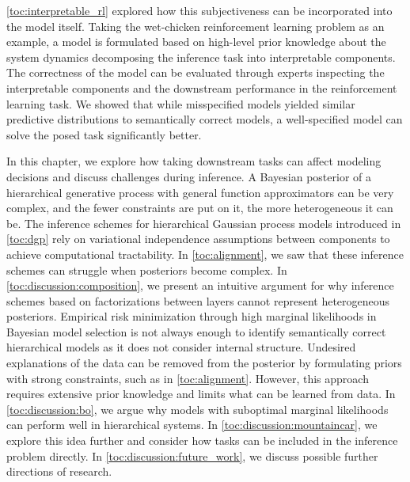 \cref{toc:interpretable_rl} explored how this subjectiveness can be incorporated into the model itself.
Taking the wet-chicken reinforcement learning problem as an example, a model is formulated based on high-level prior knowledge about the system dynamics decomposing the inference task into interpretable components.
The correctness of the model can be evaluated through experts inspecting the interpretable components and the downstream performance in the reinforcement learning task.
We showed that while misspecified models yielded similar predictive distributions to semantically correct models, a well-specified model can solve the posed task significantly better.

In this chapter, we explore how taking downstream tasks can affect modeling decisions and discuss challenges during inference.
A Bayesian posterior of a hierarchical generative process with general function approximators can be very complex, and the fewer constraints are put on it, the more heterogeneous it can be.
The inference schemes for hierarchical Gaussian process models introduced in \cref{toc:dgp} rely on variational independence assumptions between components to achieve computational tractability.
In \cref{toc:alignment}, we saw that these inference schemes can struggle when posteriors become complex.
In \cref{toc:discussion:composition}, we present an intuitive argument for why inference schemes based on factorizations between layers cannot represent heterogeneous posteriors.
Empirical risk minimization through high marginal likelihoods in Bayesian model selection is not always enough to identify semantically correct hierarchical models as it does not consider internal structure.
Undesired explanations of the data can be removed from the posterior by formulating priors with strong constraints, such as in \cref{toc:alignment}.
However, this approach requires extensive prior knowledge and limits what can be learned from data.
In \cref{toc:discussion:bo}, we argue why models with suboptimal marginal likelihoods can perform well in hierarchical systems.
In \cref{toc:discussion:mountaincar}, we explore this idea further and consider how tasks can be included in the inference problem directly.
In \cref{toc:discussion:future_work}, we discuss possible further directions of research.


